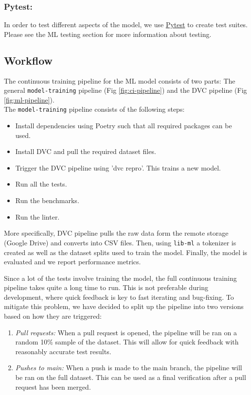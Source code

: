 \subsubsection{Pytest:}
In order to test different aspects of the model, we use {\color{blue} \href{https://pytest.org}{Pytest}} to create test suites. Please see the ML testing section for more information about testing.

\subsection{Workflow}
\label{sec:ml-tests:pipeline}
The continuous training pipeline for the ML model consists of two parts: The general \texttt{model-training} pipeline (Fig {\color{red}\ref{fig:ci-pipeline}}) and the DVC pipeline (Fig {\color{red}\ref{fig:ml-pipeline}}). \\
The \texttt{model-training} pipeline consists of the following steps: 
\begin{itemize}
    \item Install dependencies using Poetry such that all required packages can be used. 
    \item Install DVC and pull the required dataset files.
    \item Trigger the DVC pipeline using 'dvc repro'. This trains a new model.
    \item Run all the tests.
    \item Run the benchmarks.
    \item Run the linter.
\end{itemize}
More specifically, DVC pipeline pulls the raw data form the remote storage (Google Drive) and converts into CSV files. Then, using \texttt{lib-ml} a tokenizer is created as well as the dataset splits used to train the model.  Finally, the model is evaluated and we report performance metrics.

Since a lot of the tests involve training the model, the full continuous training pipeline takes quite a long time to run. This is not preferable during development, where quick feedback is key to fast iterating and bug-fixing. To mitigate this problem, we have decided to split up the pipeline into two versions based on how they are triggered:

\begin{enumerate}
    \item \textit{Pull requests:} When a pull request is opened, the pipeline will be ran on a random 10\% sample of the dataset. This will allow for quick feedback with reasonably accurate test results.
    \item \textit{Pushes to main:} When a push is made to the main branch, the pipeline will be ran on the full dataset. This can be used as a final verification after a pull request has been merged.
\end{enumerate}


